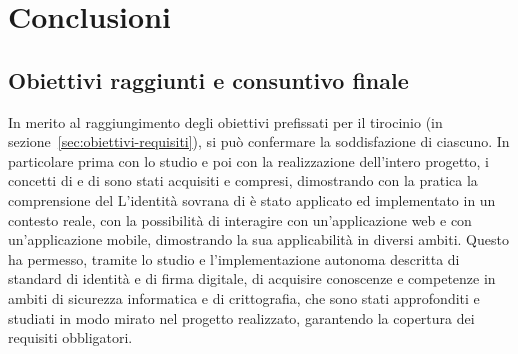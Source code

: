 \chapter{Conclusioni}\label{cap:conclusioni}


\section{Obiettivi raggiunti e consuntivo finale}\label{sec:conclusioni-obiettivi-consuntivo}

In merito al raggiungimento degli obiettivi prefissati per il tirocinio (in sezione~\ref{sec:obiettivi-requisiti}),
si può confermare la soddisfazione di ciascuno. In particolare prima con lo studio e poi con la realizzazione dell'intero progetto,
i concetti di  e di  sono stati acquisiti e compresi, dimostrando con la pratica la comprensione del
L'identità sovrana di  è stato applicato ed implementato in un contesto reale, con la possibilità di
interagire con un'applicazione web e con un'applicazione mobile, dimostrando la sua applicabilità in diversi ambiti.
Questo ha permesso, tramite lo studio e l'implementazione autonoma descritta di standard di identità e di firma digitale, di 
acquisire conoscenze e competenze in ambiti di sicurezza informatica e di crittografia, che sono stati approfonditi e studiati
in modo mirato nel progetto realizzato, garantendo la copertura dei requisiti obbligatori. \\

